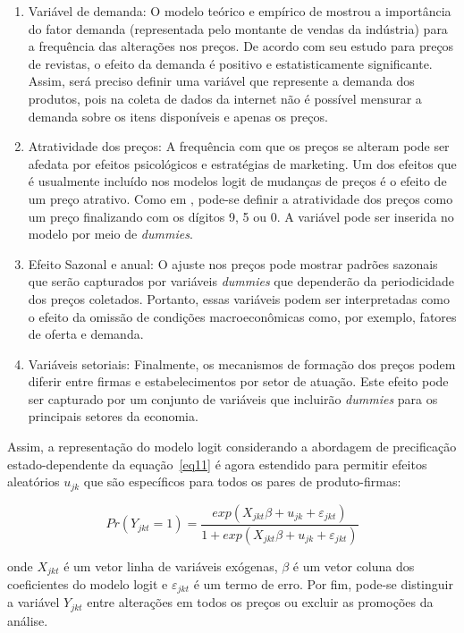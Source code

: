 \documentclass[twoside,a4paper,11pt]{report}
\begin{document}
\begin{enumerate}
  \item Variável de demanda: O modelo teórico e empírico de \citet{cecchetti1986frequency} mostrou a importância do fator demanda (representada pelo montante de vendas da indústria) para a frequência das alterações nos preços. De acordo com seu estudo para preços de revistas, o efeito da demanda é positivo e estatisticamente significante. Assim, será preciso definir uma variável que represente a demanda dos produtos, pois na coleta de dados da internet não é possível mensurar a demanda sobre os itens disponíveis e apenas os preços.
  \item Atratividade dos preços: A frequência com que os preços se alteram pode ser afedata por efeitos psicológicos e estratégias de marketing. Um dos efeitos que é usualmente incluído nos modelos logit de mudanças de preços é o efeito de um preço atrativo. Como em \citet{aucremanne2005time}, pode-se definir a atratividade dos preços como um preço finalizando com os dígitos 9, 5 ou 0. A variável pode ser inserida no modelo por meio de \emph{dummies}.
  \item Efeito Sazonal e anual: O ajuste nos preços pode mostrar padrões sazonais que serão capturados por variáveis \emph{dummies} que dependerão da periodicidade dos preços coletados. Portanto, essas variáveis podem ser interpretadas como o efeito da omissão de condições macroeconômicas como, por exemplo, fatores de oferta e demanda. 
  \item Variáveis setoriais: Finalmente, os mecanismos de formação dos preços podem diferir entre firmas e estabelecimentos por setor de atuação. Este efeito pode ser capturado por um conjunto de variáveis que incluirão \emph{dummies} para os principais setores da economia.
\end{enumerate}

Assim, a representação do modelo logit considerando a abordagem de precificação estado-dependente da equação~\ref{eq11} é agora estendido para permitir efeitos aleatórios $u_{jk}$ que são específicos para todos os pares de produto-firmas:

\begin{equation}\label{eq12}
Pr\left( { Y }_{ jkt }=1 \right) =\frac { exp\left( { X }_{ jkt }\beta +{ u }_{ jk }+{ \varepsilon  }_{ jkt } \right)  }{ 1+exp\left( { X }_{ jkt }\beta +{ u }_{ jk }+{ \varepsilon  }_{ jkt } \right)  } 
\end{equation}

\noindent onde ${ X }_{ jkt }$ é um vetor linha de variáveis exógenas, $\beta$ é um vetor coluna dos coeficientes do modelo logit e ${ \varepsilon  }_{ jkt }$ é um termo de erro. Por fim, pode-se distinguir a variável $Y_{jkt}$ entre alterações em todos os preços ou excluir as promoções da análise. 









\end{document}

